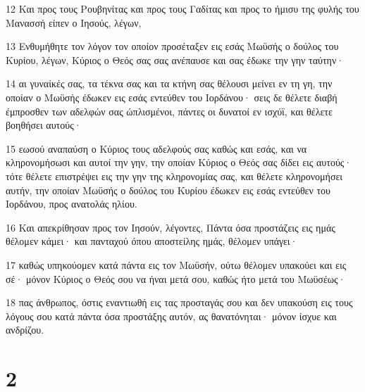 \par 12 Και προς τους Ρουβηνίτας και προς τους Γαδίτας και προς το ήμισυ της φυλής του Μανασσή είπεν ο Ιησούς, λέγων,
\par 13 Ενθυμήθητε τον λόγον τον οποίον προσέταξεν εις εσάς Μωϋσής ο δούλος του Κυρίου, λέγων, Κύριος ο Θεός σας σας ανέπαυσε και σας έδωκε την γην ταύτην·
\par 14 αι γυναίκές σας, τα τέκνα σας και τα κτήνη σας θέλουσι μείνει εν τη γη, την οποίαν ο Μωϋσής έδωκεν εις εσάς εντεύθεν του Ιορδάνου· σεις δε θέλετε διαβή έμπροσθεν των αδελφών σας ώπλισμένοι, πάντες οι δυνατοί εν ισχύϊ, και θέλετε βοηθήσει αυτούς·
\par 15 εωσού αναπαύση ο Κύριος τους αδελφούς σας καθώς και εσάς, και να κληρονομήσωσι και αυτοί την γην, την οποίαν Κύριος ο Θεός σας δίδει εις αυτούς· τότε θέλετε επιστρέψει εις την γην της κληρονομίας σας, και θέλετε κληρονομήσει αυτήν, την οποίαν Μωϋσής ο δούλος του Κυρίου έδωκεν εις εσάς εντεύθεν του Ιορδάνου, προς ανατολάς ηλίου.
\par 16 Και απεκρίθησαν προς τον Ιησούν, λέγοντες, Πάντα όσα προστάζεις εις ημάς θέλομεν κάμει· και πανταχού όπου αποστείλης ημάς, θέλομεν υπάγει·
\par 17 καθώς υπηκούομεν κατά πάντα εις τον Μωϋσήν, ούτω θέλομεν υπακούει και εις σέ· μόνον Κύριος ο Θεός σου να ήναι μετά σου, καθώς ήτο μετά του Μωϋσέως·
\par 18 πας άνθρωπος, όστις εναντιωθή εις τας προσταγάς σου και δεν υπακούση εις τους λόγους σου κατά πάντα όσα προστάξης αυτόν, ας θανατόνηται· μόνον ίσχυε και ανδρίζου.

\chapter{2}

